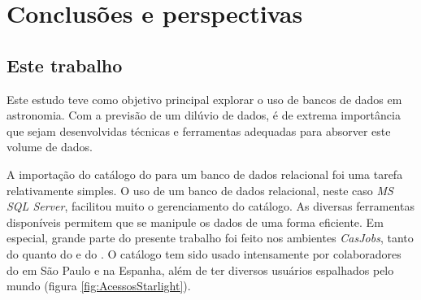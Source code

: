 


\chapter{Conclusões e perspectivas}
\label{sec:conclusao}



\section{Este trabalho}

Este estudo teve como objetivo principal explorar o uso de bancos de dados em
astronomia. Com a previsão de um dilúvio de dados, é de extrema importância que
sejam desenvolvidas técnicas e ferramentas adequadas para absorver este volume
de dados.

A importação do catálogo do \starlight para um banco de dados relacional foi uma
tarefa relativamente simples. O uso de um banco de dados relacional, neste caso
{\em MS SQL Server}, facilitou muito o gerenciamento do catálogo. As diversas
ferramentas disponíveis permitem que se manipule os dados de uma forma
eficiente. Em especial, grande parte do presente trabalho foi feito nos
ambientes {\em CasJobs}, tanto do \starlight quanto do \SDSS e do \galex. O
catálogo tem sido usado intensamente por colaboradores do \starlight em São
Paulo e na Espanha, além de ter diversos usuários espalhados pelo mundo (figura
\ref{fig:AcessosStarlight}).

